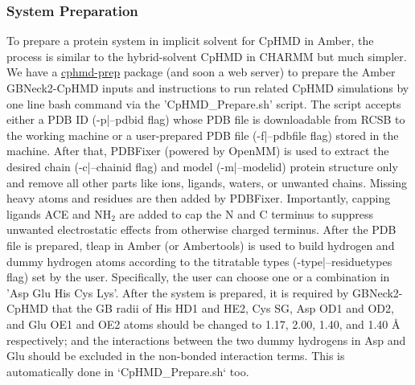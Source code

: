 \documentclass[9pt,tutorial]{livecoms}
\begin{document}
\subsubsection{System Preparation}
To prepare a protein system in implicit solvent for CpHMD in Amber, the process is similar to the hybrid-solvent CpHMD in CHARMM but much simpler. We have a \href{https://gitlab.com/shenlab-amber-cphmd/cphmd-prep}{cphmd-prep} package (and soon a web server) to prepare the Amber GBNeck2-CpHMD inputs and instructions to run related CpHMD simulations by one line bash command via the 'CpHMD\_Prepare.sh' script. The script accepts either a PDB ID (-p|--pdbid flag) whose PDB file is downloadable from RCSB to the working machine or a user-prepared PDB file (-f|--pdbfile flag) stored in the machine. After that, PDBFixer (powered by OpenMM) is used to extract the desired chain (-c|--chainid flag) and model (-m|--modelid) protein structure only and remove all other parts like ions, ligands, waters, or unwanted chains. Missing heavy atoms and residues are then added by PDBFixer. Importantly, capping ligands ACE and NH$_2$ are added to cap the N and C terminus to suppress unwanted electrostatic effects from otherwise charged terminus. After the PDB file is prepared, tleap in Amber (or Ambertools) is used to build hydrogen and dummy hydrogen atoms according to the titratable types (-type|--residuetypes flag) set by the user. Specifically, the user can choose one or a combination in 'Asp Glu His Cys Lys'. After the system is prepared, it is required by GBNeck2-CpHMD that the GB radii of His HD1 and HE2, Cys SG, Asp OD1 and OD2, and Glu OE1 and OE2 atoms should be changed to 1.17, 2.00, 1.40, and 1.40 {\AA} respectively; and the interactions between the two dummy hydrogens in Asp and Glu should be excluded in the non-bonded interaction terms. This is automatically done in `CpHMD\_Prepare.sh` too. 
\end{document}
